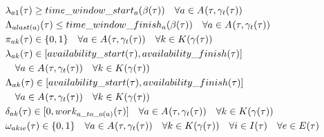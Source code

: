 \begin{alignat}{2}
	& \VarStartOfSegment{\ElementActivity}{1} \geq \ParTimeWindowStart  \quad \forall \ElementActivity \in \SetActivity{\VarSupervisorAssignment{}{\ElementTechnician}}{}                                                                                                      \\
	& \VarFinishOfSegment{\ElementActivity}{last(\ElementActivity)} \leq \ParTimeWindowFinish  \quad \forall \ElementActivity \in \SetActivity{\VarSupervisorAssignment{}{\ElementTechnician}}{}                                                                                                      \\
	& \VarActiveSegment{\ElementActivity}{\ElementWorkSegment} \in \{0, 1\}  \quad \forall \ElementActivity \in \SetActivity{\VarSupervisorAssignment{}{\ElementTechnician}}{} \quad \forall \ElementWorkSegment \in \SetWorkSegment                                                \\
	& \VarStartOfSegment{\ElementActivity}{\ElementWorkSegment} \in [\ParAvailabilityStart, \ParAvailabilityFinish]                                                                                                           \notag\\
	& \quad \forall \ElementActivity \in \SetActivity{\VarSupervisorAssignment{}{\ElementTechnician}}{} \quad \forall \ElementWorkSegment \in \SetWorkSegment                                                \\
	& \VarFinishOfSegment{\ElementActivity}{\ElementWorkSegment} \in [\ParAvailabilityStart, \ParAvailabilityFinish]                                                                                                             \notag\\
	& \quad \forall \ElementActivity \in \SetActivity{\VarSupervisorAssignment{}{\ElementTechnician}}{} \quad \forall \ElementWorkSegment \in \SetWorkSegment                                                \\
	& \VarProcessingTime \in [0, \ParOperationWork{\ElementActivity\_to\_o(\ElementActivity)} ]  \quad \forall \ElementActivity \in \SetActivity{\VarSupervisorAssignment{}{\ElementTechnician}}{} \quad \forall \ElementWorkSegment \in \SetWorkSegment                                                \\
	& \VarSegmentInRelation \in \{0 , 1\}                                                                                                                                                                                                                                                                                     \quad \forall \ElementActivity \in \SetActivity{\VarSupervisorAssignment{}{\ElementTechnician}}{} \quad \forall \ElementWorkSegment \in \SetWorkSegment  \quad \forall i \in \SetTimeInstance \quad \forall \ElementEvent \in \SetEvent                                                                                                                         \\

\end{alignat}
